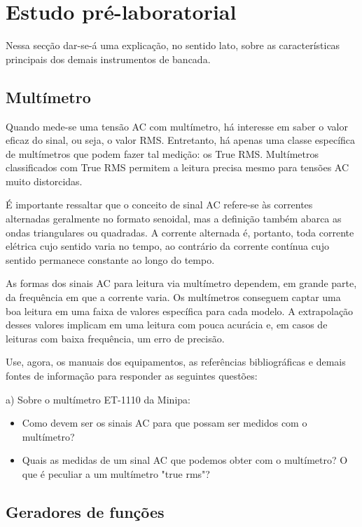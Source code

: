 \section{Estudo pré-laboratorial}

Nessa secção dar-se-á uma explicação, no sentido lato, sobre as características principais dos demais instrumentos de bancada.

\subsection{Multímetro}

Quando mede-se uma tensão AC com multímetro, há interesse em saber o valor eficaz do sinal, ou seja, o valor RMS. Entretanto, há apenas uma classe específica de multímetros que podem fazer tal medição: os True RMS. Multímetros classificados com True RMS permitem a leitura precisa mesmo para tensões AC muito distorcidas.

É importante ressaltar que o conceito de sinal AC refere-se às correntes alternadas geralmente no formato senoidal, mas a definição também abarca as ondas triangulares ou quadradas. A corrente alternada é, portanto, toda corrente elétrica cujo sentido varia no tempo, ao contrário da corrente contínua cujo sentido permanece constante ao longo do tempo.

As formas dos sinais AC para leitura via multímetro dependem, em grande parte, da frequência em que a corrente varia. Os multímetros conseguem captar uma boa leitura em uma faixa de valores específica para cada modelo. A extrapolação desses valores implicam em uma leitura com pouca acurácia e, em casos de leituras com baixa frequência, um erro de precisão.

Use, agora, os manuais dos equipamentos, as referências bibliográficas e demais fontes de informação para responder as seguintes questões:

\vspace{.3cm}

a) Sobre o multímetro ET-1110 da Minipa:
\begin{itemize}
    \item Como devem ser os sinais AC para que possam ser medidos com o multímetro?
    \item Quais as medidas de um sinal AC que podemos obter com o multímetro? O que é peculiar a um multímetro "true rms"?
\end{itemize} 


\subsection{Geradores de funções}

